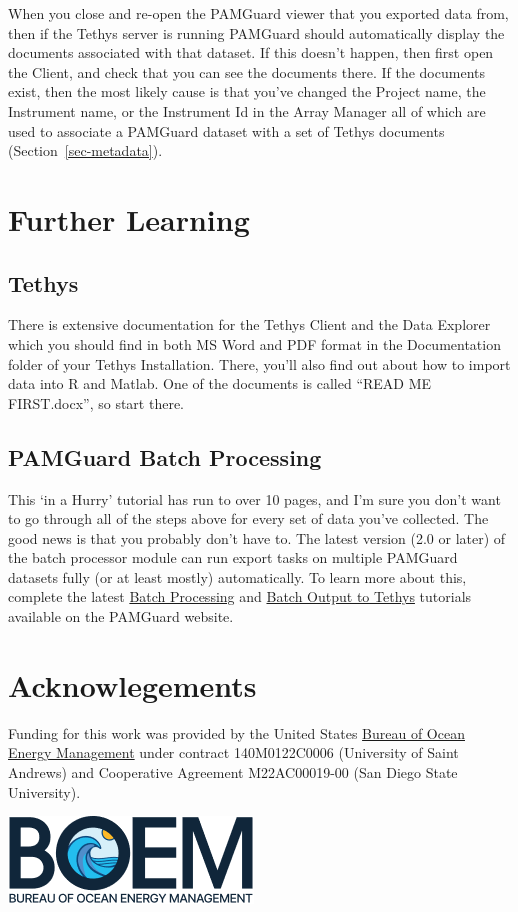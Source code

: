 \documentclass[
]{article}
\begin{document}
When you close and re-open the PAMGuard viewer that you exported data
from, then if the Tethys server is running PAMGuard should automatically
display the documents associated with that dataset. If this doesn't
happen, then first open the Client, and check that you can see the
documents there. If the documents exist, then the most likely cause is
that you've changed the Project name, the Instrument name, or the
Instrument Id in the Array Manager all of which are used to associate a
PAMGuard dataset with a set of Tethys documents
(Section~\ref{sec-metadata}).

\section{Further Learning}\label{further-learning}

\subsection{Tethys}\label{tethys}

There is extensive documentation for the Tethys Client and the Data
Explorer which you should find in both MS Word and PDF format in the
Documentation folder of your Tethys Installation. There, you'll also
find out about how to import data into R and Matlab. One of the
documents is called ``READ ME FIRST.docx'', so start there.

\subsection{PAMGuard Batch Processing}\label{pamguard-batch-processing}

This `in a Hurry' tutorial has run to over 10 pages, and I'm sure you
don't want to go through all of the steps above for every set of data
you've collected. The good news is that you probably don't have to. The
latest version (2.0 or later) of the batch processor module can run
export tasks on multiple PAMGuard datasets fully (or at least mostly)
automatically. To learn more about this, complete the latest
\href{https://www.pamguard.org/tutorials/batchprocessing.html}{Batch
Processing} and
\href{https://www.pamguard.org/tutorials/tethys.html}{Batch Output to
Tethys} tutorials available on the PAMGuard website.

\section{Acknowlegements}\label{acknowlegements}

Funding for this work was provided by the United States
\href{https://www.boem.gov/}{Bureau of Ocean Energy Management} under
contract 140M0122C0006 (University of Saint Andrews) and Cooperative
Agreement M22AC00019-00 (San Diego State University).

\href{https://www.boem.gov/}{\includegraphics[width=0.33\linewidth,height=\textheight,keepaspectratio]{media/BOEM_Logo_Web_Header.png}}
\end{document}
